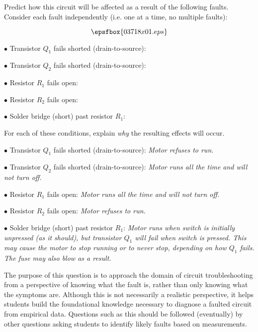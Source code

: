 

Predict how this circuit will be affected as a result of the following faults.  Consider each fault independently (i.e. one at a time, no multiple faults):

$$\epsfbox{03718x01.eps}$$

\medskip
\item{$\bullet$} Transistor $Q_1$ fails shorted (drain-to-source):
\vskip 5pt
\item{$\bullet$} Transistor $Q_2$ fails shorted (drain-to-source):
\vskip 5pt
\item{$\bullet$} Resistor $R_1$ fails open:
\vskip 5pt
\item{$\bullet$} Resistor $R_2$ fails open:
\vskip 5pt
\item{$\bullet$} Solder bridge (short) past resistor $R_1$:
\medskip

For each of these conditions, explain {\it why} the resulting effects will occur.







\medskip
\item{$\bullet$} Transistor $Q_1$ fails shorted (drain-to-source): {\it Motor refuses to run.}
\vskip 5pt
\item{$\bullet$} Transistor $Q_2$ fails shorted (drain-to-source): {\it Motor runs all the time and will not turn off.}
\vskip 5pt
\item{$\bullet$} Resistor $R_1$ fails open: {\it Motor runs all the time and will not turn off.}
\vskip 5pt
\item{$\bullet$} Resistor $R_2$ fails open: {\it Motor refuses to run.}
\vskip 5pt
\item{$\bullet$} Solder bridge (short) past resistor $R_1$: {\it Motor runs when switch is initially unpressed (as it should), but transistor $Q_1$ will fail when switch is pressed.  This may cause the motor to stop running or to never stop, depending on how $Q_1$ fails.  The fuse may also blow as a result.}
\medskip







The purpose of this question is to approach the domain of circuit troubleshooting from a perspective of knowing what the fault is, rather than only knowing what the symptoms are.  Although this is not necessarily a realistic perspective, it helps students build the foundational knowledge necessary to diagnose a faulted circuit from empirical data.  Questions such as this should be followed (eventually) by other questions asking students to identify likely faults based on measurements.




